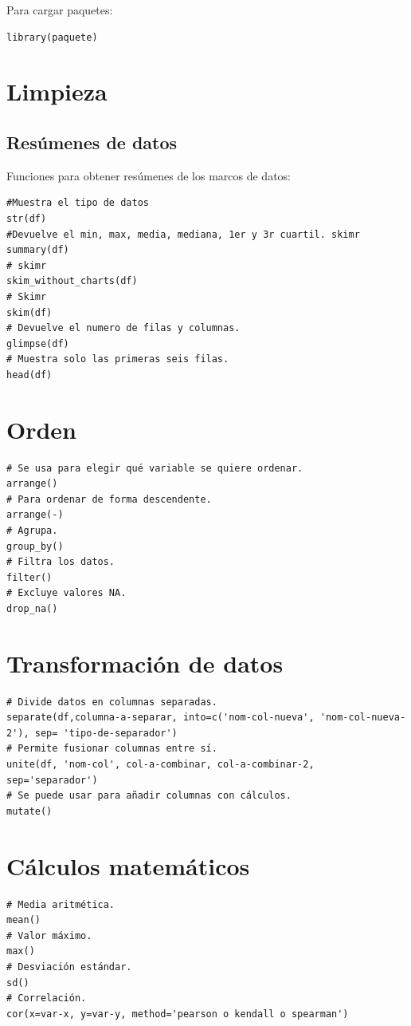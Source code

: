 \documentclass[a4paper, 12pt]{book}
\begin{document}
Para cargar paquetes:
\begin{verbatim}
library(paquete)
\end{verbatim}
\section{Limpieza}
\subsection{Resúmenes de datos}
Funciones para obtener resúmenes de los marcos de datos:
\begin{verbatim}
#Muestra el tipo de datos
str(df)
#Devuelve el min, max, media, mediana, 1er y 3r cuartil. skimr
summary(df)
# skimr
skim_without_charts(df)
# Skimr
skim(df)
# Devuelve el numero de filas y columnas.
glimpse(df)
# Muestra solo las primeras seis filas.
head(df)
\end{verbatim}
\section{Orden}
\begin{verbatim}
# Se usa para elegir qué variable se quiere ordenar.
arrange()
# Para ordenar de forma descendente.
arrange(-)
# Agrupa.
group_by()
# Filtra los datos.
filter()
# Excluye valores NA.
drop_na()
\end{verbatim}
\section{Transformación de datos}
\begin{verbatim}
# Divide datos en columnas separadas.
separate(df,columna-a-separar, into=c('nom-col-nueva', 'nom-col-nueva-2'), sep= 'tipo-de-separador')
# Permite fusionar columnas entre sí.
unite(df, 'nom-col', col-a-combinar, col-a-combinar-2, sep='separador')
# Se puede usar para añadir columnas con cálculos.
mutate()
\end{verbatim}
\section{Cálculos matemáticos}
\begin{verbatim}
# Media aritmética.
mean()
# Valor máximo.
max()
# Desviación estándar.
sd()
# Correlación.
cor(x=var-x, y=var-y, method='pearson o kendall o spearman')
\end{verbatim}
\end{document}

